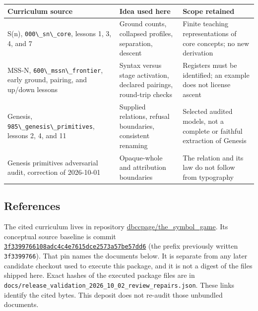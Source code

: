 \documentclass[
  11pt,
]{article}
\newcommand{\passthrough}[1]{#1}
\begin{document}
\begin{longtable}[]{@{}
  >{\raggedright\arraybackslash}p{}
  >{\raggedright\arraybackslash}p{}
  >{\raggedright\arraybackslash}p{}@{}}
\toprule\noalign{}
\begin{minipage}[b]{\linewidth}\raggedright
Curriculum source
\end{minipage} & \begin{minipage}[b]{\linewidth}\raggedright
Idea used here
\end{minipage} & \begin{minipage}[b]{\linewidth}\raggedright
Scope retained
\end{minipage} \\
\midrule\noalign{}
\endhead
\bottomrule\noalign{}
\endlastfoot
S(n), \passthrough{\lstinline!000\_sn\_core!}, lessons 1, 3, 4, and 7 &
Ground counts, collapsed profiles, separation, descent & Finite teaching
representations of core concepts; no new derivation \\
MSS-N, \passthrough{\lstinline!600\_mssn\_frontier!}, early ground,
pairing, and up/down lessons & Syntax versus stage activation, declared
pairings, round-trip checks & Registers must be identified; an example
does not license ascent \\
Genesis, \passthrough{\lstinline!985\_genesis\_primitives!}, lessons 2,
4, and 11 & Supplied relations, refusal boundaries, consistent renaming
& Selected audited models, not a complete or faithful extraction of
Genesis \\
Genesis primitives adversarial audit, correction of 2026-10-01 &
Opaque-whole and attribution boundaries & The relation and its law do
not follow from typography \\
\end{longtable}

\subsection{References}\label{references}

The cited curriculum lives in repository
\href{https://github.com/dbccpage/the_symbol_game}{dbccpage/the\_symbol\_game}.
Its conceptual source baseline is commit
\href{https://github.com/dbccpage/the_symbol_game/commit/3f3399766108adc4c4e7615dce2573a57be57dd6}{\nolinkurl{3f3399766108adc4c4e7615dce2573a57be57dd6}}
(the prefix previously written \passthrough{\lstinline!3f3399766!}).
That pin names the documents below. It is separate from any later
candidate checkout used to execute this package, and it is not a digest
of the files shipped here. Exact hashes of the executed package files
are in
\nolinkurl{docs/release_validation_2026_10_02_review_repairs.json}.
These links identify the cited bytes. This deposit does not re-audit
those unbundled documents.
\end{document}
